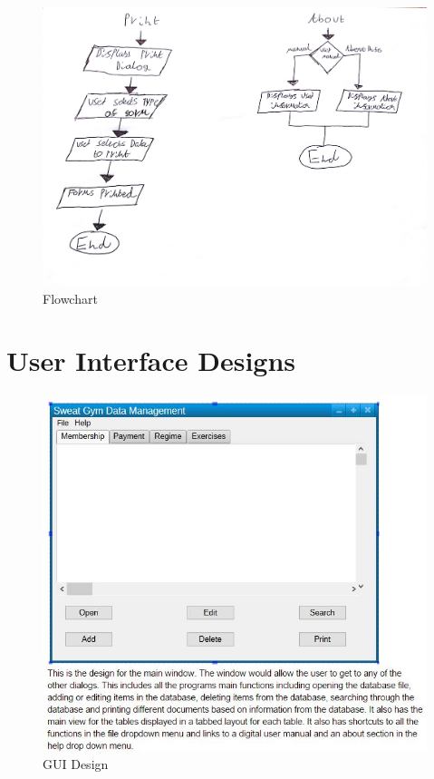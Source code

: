 \begin{figure}[H]
    \includegraphics[width=\textwidth]{flowchart1.jpg}
    \caption{Flowchart} \label{fig:Flowchart}
\end{figure}

\section{User Interface Designs}

\begin{figure}[H]
    \includegraphics[width=\textwidth]{Gui_1.JPG}
    \caption{GUI Design} \label{fig:GUI Designs}
\end{figure}

